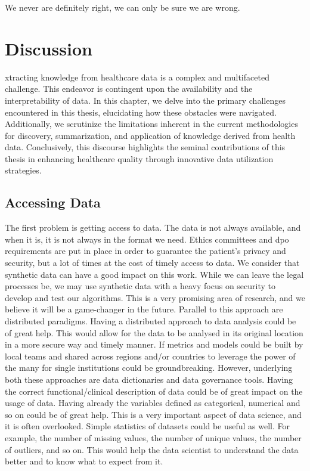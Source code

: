 
\begin{savequote}[75mm]
We never are definitely right, we can only be sure we are wrong.
\end{savequote}
\chapter{Discussion} \label{chap:disc}


xtracting knowledge from healthcare data is a complex and multifaceted challenge. This endeavor is contingent upon the availability and the interpretability of data. In this chapter, we delve into the primary challenges encountered in this thesis, elucidating how these obstacles were navigated. Additionally, we scrutinize the limitations inherent in the current methodologies for discovery, summarization, and application of knowledge derived from health data. Conclusively, this discourse highlights the seminal contributions of this thesis in enhancing healthcare quality through innovative data utilization strategies.

\section{Accessing Data}
The first problem is getting access to data. The data is not always available, and when it is, it is not always in the format we need. Ethics committees and \ac{dpo} requirements are put in place in order to guarantee the patient's privacy and security, but a lot of times at the cost of timely access to data. We consider that synthetic data can have a good impact on this work. While we can leave the legal processes be, we may use synthetic data with a heavy focus on security to develop and test our algorithms. This is a very promising area of research, and we believe it will be a game-changer in the future.
Parallel to this approach are distributed paradigms. Having a distributed approach to data analysis could be of great help. This would allow for the data to be analysed in its original location in a more secure way and timely manner. If metrics and models could be built by local teams and shared across regions and/or countries to leverage the power of the many for single institutions could be groundbreaking. However, underlying both these approaches are data dictionaries and data governance tools. Having the correct functional/clinical description of data could be of great impact on the usage of data. Having already the variables defined as categorical, numerical and so on could be of great help. This is a very important aspect of data science, and it is often overlooked. Simple statistics of datasets could be useful as well. For example, the number of missing values, the number of unique values, the number of outliers, and so on. This would help the data scientist to understand the data better and to know what to expect from it. 


